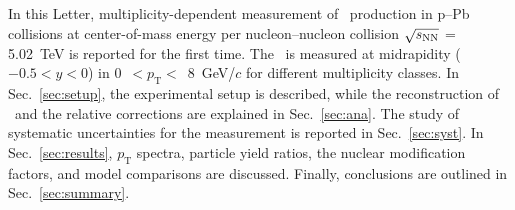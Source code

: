 In this Letter, multiplicity-dependent measurement of \fzero~production in p--Pb collisions at center-of-mass energy per nucleon--nucleon collision $\sqrt{s_{\rm NN}}$ = 5.02~TeV is reported for the first time. The \fzero~is measured at midrapidity ($-0.5<y<0$) in 0~$<p_{\mathrm{T}}<$~8~GeV/$c$ for different multiplicity classes. In Sec.~\ref{sec:setup}, the experimental setup is described, while the reconstruction of \fzero\ and the relative corrections are explained in Sec.~\ref{sec:ana}. The study of systematic uncertainties for the measurement is reported in Sec.~\ref{sec:syst}. In Sec.~\ref{sec:results}, $p_{\mathrm{T}}$ spectra, particle yield ratios, the nuclear modification factors, and model comparisons are discussed. Finally, conclusions are outlined in Sec.~\ref{sec:summary}.

\label{sec:intro}



